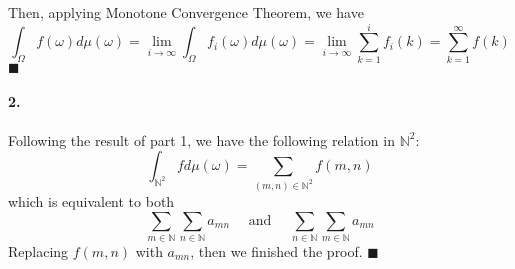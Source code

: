 \documentclass[11pt]{article}
\theoremstyle{definition}
\theoremstyle{boldtitle} %
\numberwithin{equation}{section}
\numberwithin{figure}{section}
\numberwithin{table}{section}
\begin{document}
Then, applying Monotone Convergence Theorem, we have    
\begin{equation}
    \int_\Omega f(\omega) d\mu(\omega) = \lim_{i \to \infty} \int_\Omega f_i(\omega) d\mu(\omega) = \lim_{i \to \infty} \sum_{k=1}^i f_i(k) = \sum_{k=1}^\infty f(k)
\end{equation}
\(\blacksquare\)


\paragraph{2.} Following the result of part 1, we have the following relation in $\mathbb{N}^2$:
\[
\int_{\mathbb{N}^2} f d\mu(\omega) = \sum_{(m,n) \in \mathbb{N}^2} f(m,n)
\]
which is equivalent to both 
\[
\sum_{m \in \mathbb{N}} \sum_{n \in \mathbb{N}}  a_{mn} 
\quad \text{ and } \quad
 \sum_{n \in \mathbb{N}} \sum_{m \in \mathbb{N}} a_{mn}
\]
Replacing $f(m,n)$ with $a_{mn}$, then we finished the proof. \(\blacksquare\)



\end{document}
